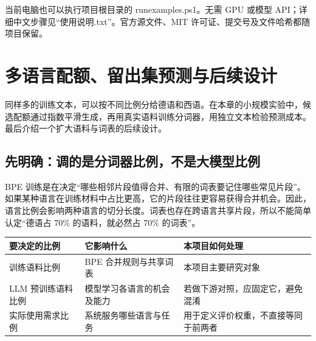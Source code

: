 \documentclass[11pt,a4paper]{article}
\newlength{\BpeDocTableWidth}
\newcommand{\BpeDocCodeInline}[1]{{\ttfamily #1}}
\newcommand{\BpeDocSection}[2]{\section{\texorpdfstring{#1}{#2}}}
\newcommand{\BpeDocSubsection}[2]{\subsection{\texorpdfstring{#1}{#2}}}
\begin{document}
当前电脑也可以执行项目根目录的 \BpeDocCodeInline{run\relax\allowbreak{}examples.\allowbreak{}ps1}。无需 GPU 或模型 API；详细中文步骤见“使用说明.txt”。官方源文件、MIT 许可证、提交号及文件哈希都随项目保留。


\FloatBarrier\par\bigskip


\BpeDocSection{多语言配额、留出集预测与后续设计}{多语言配额、留出集预测与后续设计}


同样多的训练文本，可以按不同比例分给德语和西语。在本章的小规模实验中，候选配额通过指数平滑生成，再用真实语料训练分词器，用独立文本检验预测成本。最后介绍一个扩大语料与词表的后续设计。


\BpeDocSubsection{先明确：调的是分词器比例，不是大模型比例}{先明确：调的是分词器比例，不是大模型比例}


BPE 训练是在决定“哪些相邻片段值得合并、有限的词表要记住哪些常见片段”。如果某种语言在训练材料中占比更高，它的片段往往更容易获得合并机会。因此，语言比例会影响两种语言的切分长度。词表也存在跨语言共享片段，所以不能简单认定“德语占 70\% 的语料，就必然占 70\% 的词表”。


\begingroup\fontsize{9.3}{12.7}\selectfont{}
\setlength{\BpeDocTableWidth}{\dimexpr\linewidth-6\tabcolsep\relax}
\renewcommand{\arraystretch}{1.15}
\par\addvspace{0.45em}
\noindent\begin{minipage}{\linewidth}
\begin{tabular}{>{\raggedright\arraybackslash}p{0.230000\BpeDocTableWidth}>{\raggedright\arraybackslash}p{0.385000\BpeDocTableWidth}>{\raggedright\arraybackslash}p{0.385000\BpeDocTableWidth}}
\toprule
\textbf{要决定的比例} & \textbf{它影响什么} & \textbf{本项目如何处理} \\

\midrule
\BpeDocCodeInline{Tokenizer} 训练语料比例 & BPE 合并规则与共享词表 & 本项目主要研究对象 \\[3pt]
LLM 预训练语料比例 & 模型学习各语言的机会及能力 & 若做下游对照，应固定它，避免混淆 \\[3pt]
实际使用需求比例 & 系统服务哪些语言与任务 & 用于定义评价权重，不直接等同于前两者 \\[3pt]
\bottomrule
\end{tabular}
\end{minipage}\par\addvspace{0.65em}
\endgroup
\end{document}

